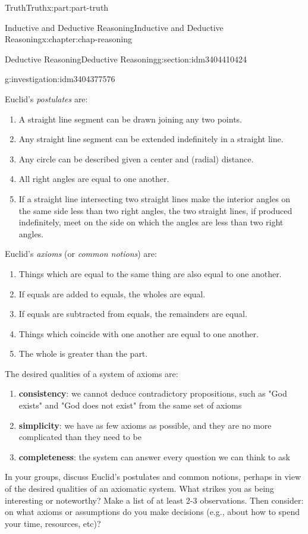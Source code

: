 \documentclass[oneside,10pt,]{book}
\newcommand{\terminology}[1]{\textbf{#1}}
\numberwithin{equation}{section}
\begin{document}
\begin{partptx}{Truth}{}{Truth}{}{}{x:part:part-truth}
\begin{chapterptx}{Inductive and Deductive Reasoning}{}{Inductive and Deductive Reasoning}{}{}{x:chapter:chap-reasoning}
\begin{sectionptx}{Deductive Reasoning}{}{Deductive Reasoning}{}{}{g:section:idm3404410424}
\begin{investigation}{}{g:investigation:idm3404377576}
\par
Euclid's \emph{postulates} are:%
%
\begin{enumerate}
\item{}A straight line segment can be drawn joining any two points.%
\item{}Any straight line segment can be extended indefinitely in a straight line.%
\item{}Any circle can be described given a center and (radial) distance.%
\item{}All right angles are equal to one another.%
\item{}If a straight line intersecting two straight lines make the interior angles on the same side less than two right angles, the two straight lines, if produced indefinitely, meet on the side on which the angles are less than two right angles.%
\end{enumerate}
Euclid's \emph{axioms} (or \emph{common notions}) are:%
%
\begin{enumerate}
\item{}Things which are equal to the same thing are also equal to one another.%
\item{}If equals are added to equals, the wholes are equal.%
\item{}If equals are subtracted from equals, the remainders are equal.%
\item{}Things which coincide with one another are equal to one another.%
\item{}The whole is greater than the part.%
\end{enumerate}
The desired qualities of a system of axioms are:%
%
\begin{enumerate}
\item{}\terminology{consistency}: we cannot deduce contradictory propositions, such as "God exists" and "God does not exist" from the same set of axioms%
\item{}\terminology{simplicity}: we have as few axioms as possible, and they are no more complicated than they need to be%
\item{}\terminology{completeness}: the system can answer every question we can think to ask%
\end{enumerate}
In your groups, discuss Euclid's postulates and common notions, perhaps in view of the desired qualities of an axiomatic system. What strikes you as being interesting or noteworthy? Make a list of at least 2-3 observations. Then consider: on what axioms or assumptions do you make decisions (e.g., about how to spend your time, resources, etc)?%

\end{investigation}
\end{sectionptx}
\end{chapterptx}
\end{partptx}
\end{document}

